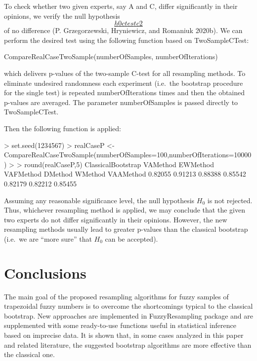 To check whether two given experts, say A and C, differ significantly in
their opinions, we verify the null hypothesis
\protect\hyperlink{h0ctestc2}{\[h0ctestc2\]} of no difference (P. Grzegorzewski, Hryniewicz, and Romaniuk 2020b). We
can perform the desired test using the following function based on
TwoSampleCTest:

\begin{example}
CompareRealCaseTwoSample(numberOfSamples, numberOfIterations)
\end{example}

which delivers p-values of the two-sample C-test for all resampling
methods. To eliminate undesired randomness each experiment (i.e.~the
bootstrap procedure for the single test) is repeated numberOfIterations
times and then the obtained p-values are averaged. The parameter
numberOfSamples is passed directly to TwoSampleCTest.

Then the following function is applied:

\begin{example}
\textgreater{} set.seed(1234567) \textgreater{} realCaseP \textless-
CompareRealCaseTwoSample(numberOfSamples=100,numberOfIterations=10000)
\textgreater{} \textgreater{} round(realCaseP,5) ClassicalBootstrap VAMethod EWMethod VAFMethod
DMethod WMethod VAAMethod 0.82055 0.91213 0.88388 0.85542 0.82179
0.82212 0.85455
\end{example}

Assuming any reasonable significance level, the null hypothesis \(H_0\) is
not rejected. Thus, whichever resampling method is applied, we may
conclude that the given two experts do not differ significantly in their
opinions. However, the new resampling methods usually lead to greater
p-values than the classical bootstrap (i.e.~we are ``more sure'' that
\(H_0\) can be accepted).

\hypertarget{conclusions}{%
\section{Conclusions}\label{conclusions}}

The main goal of the proposed resampling algorithms for fuzzy samples of
trapezoidal fuzzy numbers is to overcome the shortcomings typical to the
classical bootstrap. New approaches are implemented in FuzzyResampling
package and are supplemented with some ready-to-use functions useful in
statistical inference based on imprecise data. It is shown that, in some
cases analyzed in this paper and related literature, the suggested
bootstrap algorithms are more effective than the classical one.

